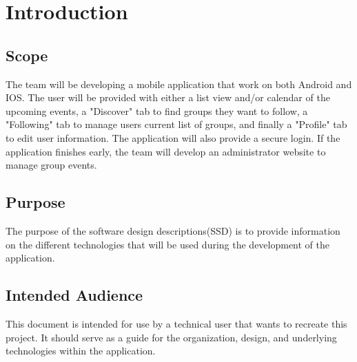 \documentclass[letterpaper, 10pt,titlepage]{article}
\begin{document}
\tableofcontents
\newpage

\section{Introduction}
\subsection{Scope}
The team will be developing a mobile application that work on both Android and IOS. The user will be provided with either a list view and/or calendar of the upcoming events, a "Discover" tab to find groups they want to follow, a "Following" tab to manage users current list of groups, and finally a "Profile" tab to edit user information. The application will also provide a secure login. If the application finishes early, the team will develop an administrator website to manage group events.
\subsection{Purpose}
The purpose of the software design descriptions(SSD) is to provide information on the different technologies that will be used during the development of the application.
\subsection{Intended Audience}
This document is intended for use by a technical user that wants to recreate this project. It should serve as a guide for the organization, design, and underlying technologies within the application.
\end{document}
